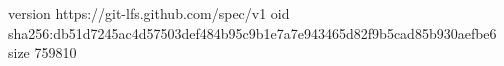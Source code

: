 version https://git-lfs.github.com/spec/v1
oid sha256:db51d7245ac4d57503def484b95c9b1e7a7e943465d82f9b5cad85b930aefbe6
size 759810
